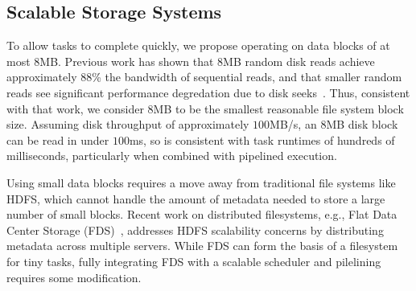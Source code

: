 \subsection{Scalable Storage Systems}
To allow tasks to complete quickly, we propose operating on data blocks of
at most $8$MB. Previous work has shown that $8$MB random disk reads achieve
approximately $88$\% the bandwidth of sequential reads, and that smaller random
reads see significant performance degredation due to disk
seeks~\cite{nightingale2012flat}. Thus, consistent with that work, we consider
$8$MB to be the smallest reasonable file system block size. Assuming disk
throughput of approximately $100$MB/s, an $8$MB disk block can be read in under
$100$ms, so is consistent with task runtimes of hundreds of milliseconds,
particularly when combined with pipelined execution.

Using small data blocks requires a move away from traditional file systems like
HDFS, which cannot handle the amount of metadata needed to store a large
number of small blocks.  Recent work on distributed filesystems, e.g., Flat
Data Center Storage (FDS)~\cite{nightingale2012flat}, addresses HDFS scalability
concerns by distributing metadata across multiple servers. While FDS can form
the basis of a filesystem for tiny tasks, fully integrating FDS with a scalable
scheduler and pilelining requires some modification.

